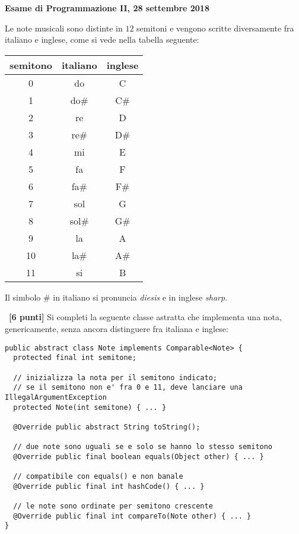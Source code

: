 \documentclass[12pt]{article}
\newcounter{esnu}
\newenvironment{esercizio}{\medskip \noindent {\bf Esercizio\addtocounter{esnu}{1} \arabic{esnu}}}{}
\begin{document}
\begin{center} {\bf Esame di Programmazione II, 28 settembre 2018}\end{center}

Le note musicali sono distinte in $12$ semitoni e vengono scritte diversamente
fra italiano e inglese, come si vede nella tabella seguente:
%
\begin{center}
  \begin{tabular}{|c|c|c|}
    \hline
    \textbf{semitono} & \textbf{italiano} & \textbf{inglese} \\\hline\hline
    0  & do    & C   \\\hline
    1  & do\#  & C\# \\\hline
    2  & re    & D   \\\hline
    3  & re\#  & D\# \\\hline
    4  & mi    & E   \\\hline
    5  & fa    & F   \\\hline
    6  & fa\#  & F\# \\\hline
    7  & sol   & G   \\\hline
    8  & sol\# & G\# \\\hline
    9  & la    & A   \\\hline
    10 & la\#  & A\# \\\hline
    11 & si    & B   \\\hline
  \end{tabular}
\end{center}
%
Il simbolo \# in italiano si pronuncia \emph{diesis} e in inglese \emph{sharp}.

\begin{esercizio}~\textbf{[6 punti]}
  Si completi la seguente classe astratta che implementa una nota,
  genericamente, senza ancora distinguere fra italiana e inglese:
%
\begin{lstlisting}
public abstract class Note implements Comparable<Note> {
  protected final int semitone;

  // inizializza la nota per il semitono indicato;
  // se il semitono non e' fra 0 e 11, deve lanciare una IllegalArgumentException
  protected Note(int semitone) { ... }

  @Override public abstract String toString();

  // due note sono uguali se e solo se hanno lo stesso semitono
  @Override public final boolean equals(Object other) { ... }

  // compatibile con equals() e non banale
  @Override public final int hashCode() { ... }

  // le note sono ordinate per semitono crescente
  @Override public final int compareTo(Note other) { ... }
}
\end{lstlisting}
\end{esercizio}
\end{document}
